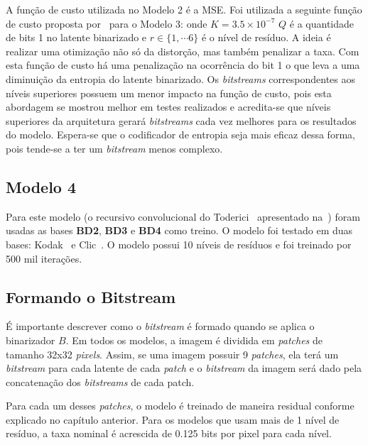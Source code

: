 A função de custo utilizada no Modelo 2 é a \acrshort{MSE}. Foi utilizada a seguinte função de custo proposta por~\cite{marcelo} para o Modelo 3: 
onde $K = 3.5 \times 10^{-7}$ $Q$ é a quantidade de bits 1 no latente binarizado e $r \in \{1, \cdots 6\}$ é o nível de resíduo. A ideia é realizar uma otimização não só da distorção, mas também penalizar a taxa. Com esta função de custo há uma penalização na ocorrência do bit 1 o que leva a uma diminuição da entropia do latente binarizado. Os \textit{bitstreams} correspondentes aos níveis superiores possuem um menor impacto na função de custo, pois esta abordagem se mostrou melhor em testes realizados e acredita-se que níveis superiores da arquitetura gerará \textit{bitstreams} cada vez melhores para os resultados do modelo. Espera-se que o codificador de entropia seja mais eficaz dessa forma, pois tende-se a ter um \textit{bitstream} menos complexo.
\subsection{Modelo 4}
Para este modelo (o recursivo convolucional do Toderici~\cite{toderici2016} apresentado na~) foram usadas as bases \textbf{BD2}, \textbf{BD3} e \textbf{BD4} como treino. O modelo foi testado em duas bases: Kodak~\cite{kodak} e Clic~\cite{clic}. O modelo possui 10 níveis de resíduos e foi treinado por 500 mil iterações.
\subsection{Formando o Bitstream}
É importante descrever como o \textit{bitstream} é formado quando se aplica o binarizador $B$. Em todos os modelos, a imagem é dividida em \textit{patches} de tamanho 32x32 \textit{pixels}. Assim, se uma imagem possuir 9 \textit{patches}, ela terá um \textit{bitstream} para cada latente de cada \textit{patch} e o \textit{bitstream} da imagem será dado pela concatenação dos \textit{bitstreams} de cada patch. 

Para cada um desses \textit{patches}, o modelo é treinado de maneira residual conforme explicado no capítulo anterior. Para os modelos que usam mais de 1 nível de resíduo, a taxa nominal é acrescida de 0.125 bits por pixel para cada nível. 

